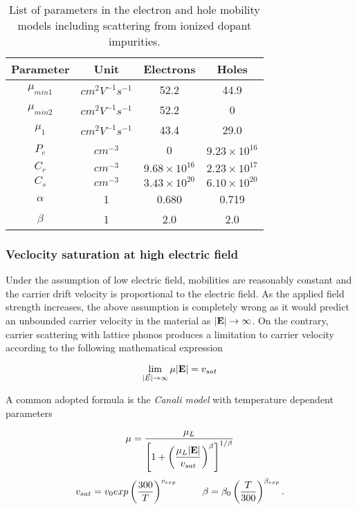 \begin{table}[!h]
\centering
\begin{tabular}{cccc}
\toprule
Parameter & Unit & Electrons & Holes \\
\midrule
$\mu_{min1}$ & $cm^2V^{-1}s^{-1}$ & 52.2 & 44.9\\
$\mu_{min2}$ & $cm^2V^{-1}s^{-1}$ & 52.2 & 0\\
$\mu_1$ & $cm^2V^{-1}s^{-1}$ & 43.4 & 29.0 \\
$P_c$ & $cm^{-3}$ & 0 & $9.23\times 10^{16}$\\
$C_r$ & $cm^{-3}$ &  $9.68\times 10^{16}$ & $2.23\times 10^{17}$ \\
$C_s$ & $cm^{-3}$ & $3.43\times 10^{20}$ & $6.10\times 10^{20}$\\
$\alpha$& 1 & 0.680 & 0.719  \\
$\beta$& 1 & 2.0 & 2.0 \\
\bottomrule
\end{tabular}
\caption{List of parameters in the electron and hole mobility models including scattering from ionized dopant impurities.}
\end{table}


\subsubsection{Veclocity saturation at high electric field}

Under the assumption of low electric field, mobilities are reasonably constant and the carrier drift velocity is proportional to the electric field. As the applied field strength increases, the above assumption is completely wrong as it would predict an unbounded carrier velocity in the material as $|\mathbf{E}| \rightarrow \infty$.
On the contrary, carrier scattering with lattice phonos produces a limitation to carrier velocity according to the following mathematical expression

\begin{equation}
\label{eq: velocity saturation}
\lim_{|\vec{E}| \to \infty} \mu |\mathbf{E}| = v_{sat}
\end{equation} 

A common adopted formula is the \textit{Canali model} with temperature dependent parameters

\begin{equation}
\label{eq: mobility canali}
\mu = \dfrac{\mu_{L}}{\left[ 1 + \left( \dfrac{\mu_{L}|\mathbf{E}|}{v_{sat}} \right)^{\beta}   \right]^{1/\beta}} 
\end{equation}
\vspace{0.5cm}
\begin{equation}
\label{eq: mobility canali beta}
v_{sat} = v_0exp\left( 	\dfrac{300}{T} \right)^{v_{exp}} 
\psp{15}
\beta= \beta_0 \left( \dfrac{T}{300} \right)^{\beta_{exp}}.
\end{equation}


